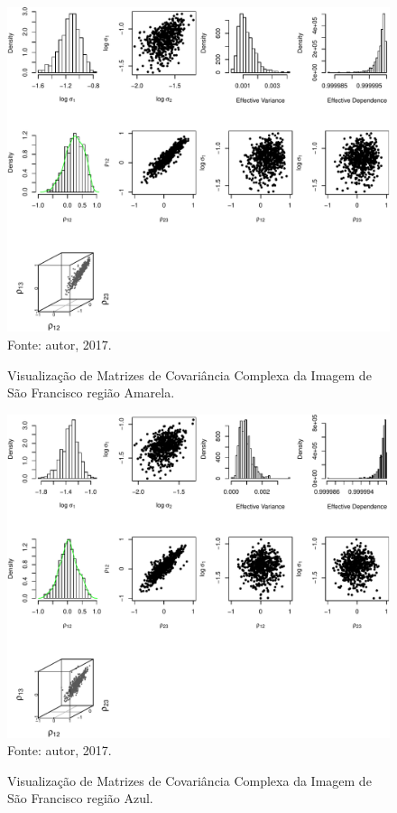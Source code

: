 \documentclass[journal]{IEEEtran}
\begin{document}
\begin{figure}[ht]
\centering
\caption{Visualização de Matrizes de Covariância Complexa da Imagem de São Francisco região Amarela.}
\includegraphics[width=\linewidth]{../../Figuras/Amostras-SanFrancisc/SanFrancisc-Amarela-500.pdf}\\
Fonte: autor, 2017.
\label{visSanFrancisc1}
\end{figure}

\newpage

\begin{figure}[ht]
\centering
\caption{Visualização de Matrizes de Covariância Complexa da Imagem de São Francisco região Azul.}
\includegraphics[width=\linewidth]{../../Figuras/Amostras-SanFrancisc/SanFrancisc-Azul-500.pdf}\\
Fonte: autor, 2017.
\label{visSanFrancisc2}
\end{figure}
\end{document}
